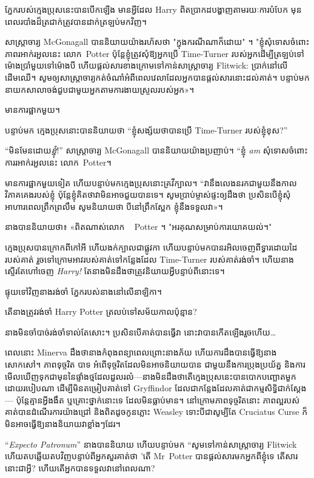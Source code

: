 ភ្នែករបស់ក្មេងប្រុសនេះបានបើកឡើង មានអ្វីដែល Harry ពិតប្រាកដបង្ហាញតាមរយៈការបំបែក មុនពេលរបាំងដ៏ត្រជាក់ត្រូវបានដាក់ត្រឡប់មកវិញ។

សាស្រ្តាចារ្យ McGonagall បាននិយាយយ៉ាងរហ័សថា "ក្នុងករណីណាក៏ដោយ" ។ "ខ្ញុំសុំទោសចំពោះភាពរអាក់រអួលនេះ លោក~Potter ប៉ុន្តែខ្ញុំត្រូវសុំឱ្យអ្នកប្រើ Time-Turner របស់អ្នកដើម្បីត្រឡប់ទៅម៉ោងប្រាំមួយទៅម៉ោងបី ហើយផ្តល់សារខាងក្រោមទៅកាន់សាស្រ្តាចារ្យ Flitwick: ប្រាក់នៅលើដើមឈើ។ សូម​ឲ្យ​សាស្ត្រាចារ្យ​កត់ចំណាំ​អំពី​ពេលវេលា​ដែល​អ្នក​បាន​ផ្តល់​សារ​នោះ​ដល់​គាត់។ បន្ទាប់​មក នាយក​សាលា​ចង់​ជួប​ជាមួយ​អ្នក​តាម​ការ​ងាយ​ស្រួល​របស់​អ្នក»។

មានការផ្អាកមួយ។

បន្ទាប់មក ក្មេងប្រុសនោះបាននិយាយថា “ខ្ញុំសង្ស័យថាបានប្រើ Time-Turner របស់ខ្ញុំខុស?”

“មិនមែនដោយ\emph{ខ្ញុំ}!” សាស្ត្រាចារ្យ McGonagall បាននិយាយយ៉ាងប្រញាប់។ “ខ្ញុំ \emph{am} សុំទោសចំពោះការរអាក់រអួលនេះ លោក~Potter។

មាន​ការ​ផ្អាក​មួយ​ទៀត ហើយ​បន្ទាប់​មក​ក្មេង​ប្រុស​នោះ​គ្រវីក្បាល។ “វានឹងលេងនរកជាមួយនឹងកាលវិភាគគេងរបស់ខ្ញុំ ប៉ុន្តែខ្ញុំគិតថាវាមិនអាចជួយបានទេ។ សូម​ប្រាប់​ម្ចាស់​ផ្ទះ​ឲ្យ​ដឹង​ថា ប្រសិន​បើ​ខ្ញុំ​សុំ​អាហារ​ពេល​ព្រឹក​ព្រលឹម សូម​និយាយ​ថា បី\am នៅ​ព្រឹក​ស្អែក ខ្ញុំ​នឹង​ទទួល​វា»។

នាង​បាន​និយាយ​ថា​៖ «​ពិត​ណាស់​លោក ~ Potter ។ "អរគុណសម្រាប់ការយោគយល់។"

ក្មេងប្រុសបានក្រោកពីកៅអី ហើយងក់ក្បាលជាផ្លូវកា ហើយបន្ទាប់មកបានរអិលចេញពីទ្វារដោយដៃរបស់គាត់ រួចទៅក្រោមអាវរបស់គាត់ទៅកន្លែងដែល Time-Turner របស់គាត់រង់ចាំ។ ហើយនាងស្ទើរតែហៅចេញ \emph{Harry!} តែនាងមិនដឹងថាត្រូវនិយាយអ្វីបន្ទាប់ពីនោះទេ។

ផ្ទុយទៅវិញនាងរង់ចាំ ភ្នែករបស់នាងនៅលើនាឡិកា។

តើ​នាង​ត្រូវ​រង់ចាំ​ Harry Potter ត្រលប់​ទៅ​សម័យ​កាល​ប៉ុន្មាន?

នាងមិនចាំបាច់រង់ចាំទាល់តែសោះ។ ប្រសិនបើគាត់បានធ្វើវា នោះវាបានកើតឡើងរួចហើយ…

ពេលនោះ Minerva ដឹងថានាងកំពុងពន្យាពេលព្រោះនាងភ័យ ហើយការដឹងបានធ្វើឱ្យនាងសោកសៅ។ ភាពទុច្ចរិត បាទ អំពើទុច្ចរិតដែលមិនអាចនិយាយបាន ជាមួយនឹងការប្រុងប្រយ័ត្ន និងការមើលឃើញទុកជាមុននៃផ្ទាំងថ្មដែលដួលរលំ—នាងមិនដឹងថាតើក្មេងប្រុសនេះបានបោកបញ្ឆោតមួកដោយរបៀបណា ដើម្បីមិនតម្រៀបគាត់ទៅ Gryffindor ដែលជាកន្លែងដែលគាត់ជាកម្មសិទ្ធិជាក់ស្តែង — ប៉ុន្តែគ្មានអ្វីងងឹត ឬគ្រោះថ្នាក់នោះទេ ដែលមិនធ្លាប់មាន។ នៅក្រោមភាពទុច្ចរិតនោះ ភាពល្អរបស់គាត់បានដំណើរការយ៉ាងជ្រៅ និងពិតដូចកូនភ្លោះ Weasley ទោះបីជាសូម្បីតែ Cruciatus Curse ក៏មិនអាចធ្វើឱ្យនាងនិយាយវាខ្លាំងៗដែរ។

“\emph{Expecto Patronum}” នាង​បាន​និយាយ ហើយ​បន្ទាប់​មក “សូម​ទៅ​កាន់​សាស្ត្រាចារ្យ Flitwick ហើយ​តប​ឆ្លើយ​តប​វិញ​បន្ទាប់​ពី​អ្នក​សួរ​គាត់​ថា 'តើ Mr~Potter បាន​ផ្តល់​សារ​មក​អ្នក​ពី​ខ្ញុំ​ទេ តើ​សារ​នោះ​ជា​អ្វី? ហើយតើអ្នកបានទទួលវានៅពេលណា?

